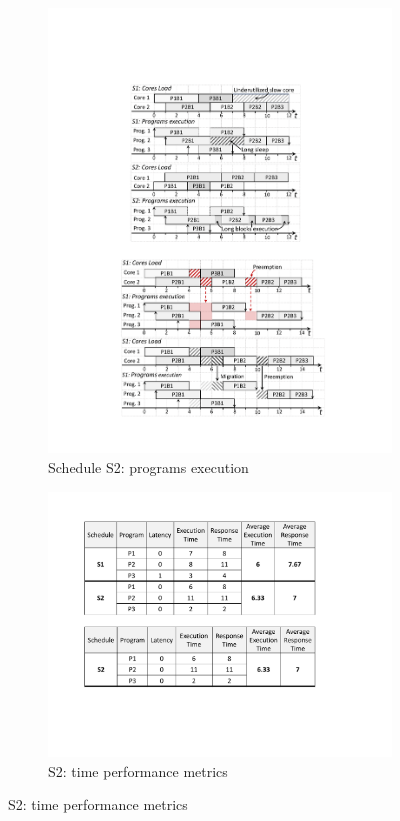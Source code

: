 \begin{figure}
\begin{minipage}{.7\columnwidth}%
\begin{subfigure}{\linewidth}
\includegraphics[width=\linewidth]{figs/s2.pdf}
\caption{Schedule S2: programs execution}
\vspace{3mm}
\label{fig:s2}
\end{subfigure}

\begin{subfigure}{\linewidth}
\includegraphics[width=\linewidth]{figs/s2Metrics.pdf}
\caption{S2: time performance metrics}
\vspace{1mm}
\label{fig:s2Metrics}
\end{subfigure}
\end{minipage}%


\end{figure}
